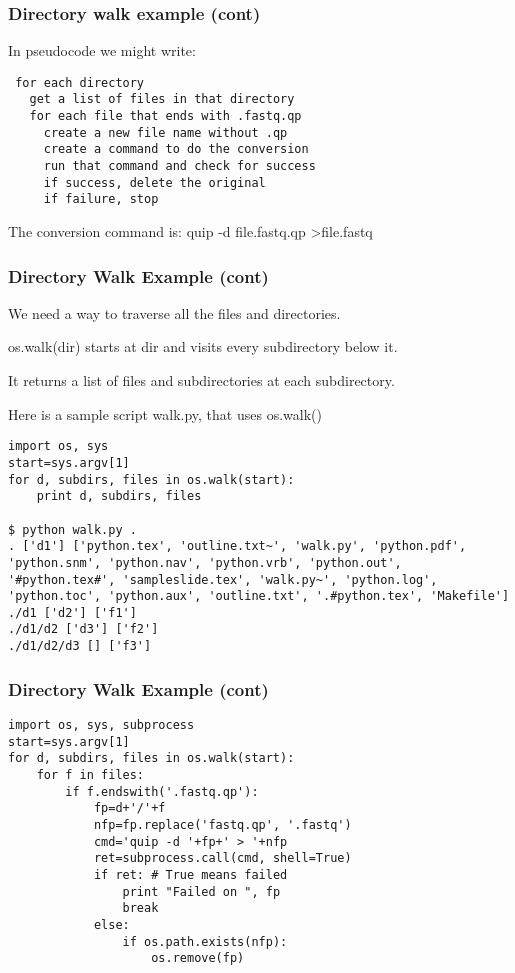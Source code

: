 \documentclass[10pt]{beamer}
\newcommand\smallfont{\fontsize{8pt}{7.2}\selectfont}
\begin{document}
\begin{frame}[fragile]
\frametitle{Directory walk example (cont)}
\smallfont
In pseudocode we might write:
\begin{verbatim}
 for each directory
   get a list of files in that directory
   for each file that ends with .fastq.qp
     create a new file name without .qp
     create a command to do the conversion
     run that command and check for success
     if success, delete the original
     if failure, stop
\end{verbatim}

The conversion command is: quip -d file.fastq.qp \textgreater file.fastq 

\end{frame}

\begin{frame}[fragile]
\frametitle{Directory Walk Example (cont)}

We need a way to traverse all the files and directories.
\vspace{2mm}

os.walk(dir) starts at dir and visits every subdirectory below it.
\vspace{2mm}

It returns a list of files and subdirectories at each subdirectory. 
\vspace{2mm}

Here is a sample script walk.py, that uses os.walk()

\smallfont
\begin{verbatim}
import os, sys
start=sys.argv[1]
for d, subdirs, files in os.walk(start):
    print d, subdirs, files

$ python walk.py .
. ['d1'] ['python.tex', 'outline.txt~', 'walk.py', 'python.pdf', 'python.snm', 'python.nav', 'python.vrb', 'python.out', '#python.tex#', 'sampleslide.tex', 'walk.py~', 'python.log', 'python.toc', 'python.aux', 'outline.txt', '.#python.tex', 'Makefile']
./d1 ['d2'] ['f1']
./d1/d2 ['d3'] ['f2']
./d1/d2/d3 [] ['f3']

\end{verbatim}
\end{frame}

\begin{frame}[fragile]
\frametitle{Directory Walk Example (cont)}

\begin{verbatim}
import os, sys, subprocess
start=sys.argv[1]
for d, subdirs, files in os.walk(start):
    for f in files:
        if f.endswith('.fastq.qp'):
            fp=d+'/'+f
            nfp=fp.replace('fastq.qp', '.fastq')
            cmd='quip -d '+fp+' > '+nfp
            ret=subprocess.call(cmd, shell=True)
            if ret: # True means failed
                print "Failed on ", fp
                break
            else:
                if os.path.exists(nfp):
                    os.remove(fp)
\end{verbatim}
\end{frame}
\end{document}
